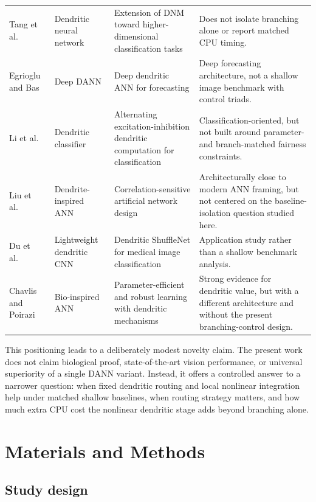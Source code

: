 \documentclass[preprint,12pt]{elsarticle}
\begin{document}
\begin{longtable}{p{1.95cm} p{1.55cm} p{3.80cm} p{5.45cm}}
Tang et al.\ \cite{tang2024dnn} & Dendritic neural network & Extension of DNM toward higher-dimensional classification tasks & Does not isolate branching alone or report matched CPU timing. \\
Egrioglu and Bas \cite{egrioglu2024deepdann} & Deep DANN & Deep dendritic ANN for forecasting & Deep forecasting architecture, not a shallow image benchmark with control triads. \\
Li et al.\ \cite{li2024alternating} & Dendritic classifier & Alternating excitation-inhibition dendritic computation for classification & Classification-oriented, but not built around parameter- and branch-matched fairness constraints. \\
Liu et al.\ \cite{liu2024capturecorr} & Dendrite-inspired ANN & Correlation-sensitive artificial network design & Architecturally close to modern ANN framing, but not centered on the baseline-isolation question studied here. \\
Du et al.\ \cite{du2025shuffle} & Lightweight dendritic CNN & Dendritic ShuffleNet for medical image classification & Application study rather than a shallow benchmark analysis. \\
Chavlis and Poirazi \cite{chavlis2025parameter} & Bio-inspired ANN & Parameter-efficient and robust learning with dendritic mechanisms & Strong evidence for dendritic value, but with a different architecture and without the present branching-control design. \\
\bottomrule
\end{longtable}
\endgroup

This positioning leads to a deliberately modest novelty claim. The present work does not claim biological proof, state-of-the-art vision performance, or universal superiority of a single DANN variant. Instead, it offers a controlled answer to a narrower question: when fixed dendritic routing and local nonlinear integration help under matched shallow baselines, when routing strategy matters, and how much extra CPU cost the nonlinear dendritic stage adds beyond branching alone.

\section{Materials and Methods}
\label{sec:methods}

\subsection{Study design}
\label{sec:design}
\end{document}
